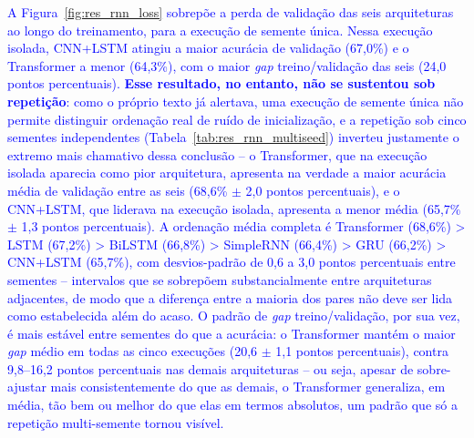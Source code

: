 \documentclass[times,final]{elsarticle}
\begin{document}
\textcolor{blue}{A Figura~\ref{fig:res_rnn_loss} sobrepõe a perda de validação das seis arquiteturas ao longo do treinamento, para a execução de semente única. Nessa execução isolada, CNN+LSTM atingiu a maior acurácia de validação (67,0\%) e o Transformer a menor (64,3\%), com o maior \textit{gap} treino/validação das seis (24,0 pontos percentuais). \textbf{Esse resultado, no entanto, não se sustentou sob repetição}: como o próprio texto já alertava, uma execução de semente única não permite distinguir ordenação real de ruído de inicialização, e a repetição sob cinco sementes independentes (Tabela~\ref{tab:res_rnn_multiseed}) inverteu justamente o extremo mais chamativo dessa conclusão -- o Transformer, que na execução isolada aparecia como pior arquitetura, apresenta na verdade a maior acurácia média de validação entre as seis (68,6\% $\pm$ 2,0 pontos percentuais), e o CNN+LSTM, que liderava na execução isolada, apresenta a menor média (65,7\% $\pm$ 1,3 pontos percentuais). A ordenação média completa é Transformer (68,6\%) > LSTM (67,2\%) > BiLSTM (66,8\%) > SimpleRNN (66,4\%) > GRU (66,2\%) > CNN+LSTM (65,7\%), com desvios-padrão de 0,6 a 3,0 pontos percentuais entre sementes -- intervalos que se sobrepõem substancialmente entre arquiteturas adjacentes, de modo que a diferença entre a maioria dos pares não deve ser lida como estabelecida além do acaso. O padrão de \textit{gap} treino/validação, por sua vez, é mais estável entre sementes do que a acurácia: o Transformer mantém o maior \textit{gap} médio em todas as cinco execuções (20,6 $\pm$ 1,1 pontos percentuais), contra 9,8--16,2 pontos percentuais nas demais arquiteturas -- ou seja, apesar de sobre-ajustar mais consistentemente do que as demais, o Transformer generaliza, em média, tão bem ou melhor do que elas em termos absolutos, um padrão que só a repetição multi-semente tornou visível.}
\end{document}
